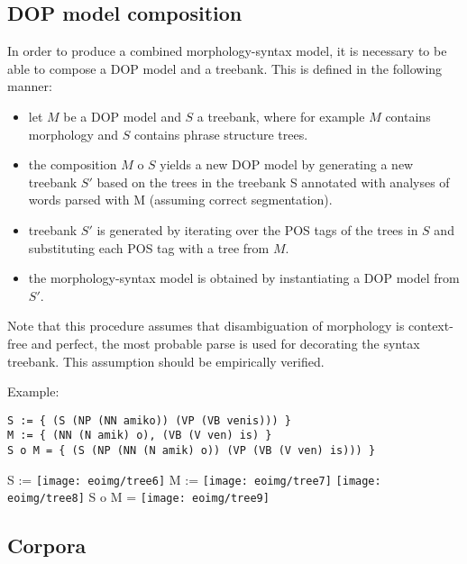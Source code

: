 \documentclass[10pt,a4paper]{article}
\begin{document}
\subsection{DOP model composition}

In order to produce a combined morphology-syntax model, it is necessary to be
able to compose a DOP model and a treebank. This is defined in the following
manner:

\begin{itemize}
\item let $M$ be a DOP model and $S$ a treebank, where for example $M$ contains
      morphology and $S$ contains phrase structure trees.
\item the composition $M$ o $S$ yields a new DOP model by generating a new
      treebank $S'$ based on the trees in the treebank S annotated with
      analyses of words parsed with M (assuming correct segmentation).
\item treebank $S'$ is generated by iterating over the POS tags of the trees in
      $S$ and substituting each POS tag with a tree from $M$.
\item the morphology-syntax model is obtained by instantiating a DOP model from
      $S'$.
\end{itemize}

Note that this procedure assumes that disambiguation of morphology is
context-free and perfect, the most probable parse is used for decorating the
syntax treebank.  This assumption should be empirically verified. 

Example:

\begin{verbatim}
S := { (S (NP (NN amiko)) (VP (VB venis))) } 
M := { (NN (N amik) o), (VB (V ven) is) }
S o M = { (S (NP (NN (N amik) o)) (VP (VB (V ven) is))) }
\end{verbatim}
S := %
\texttt{[image: eoimg/tree6]}
M := %
\texttt{[image: eoimg/tree7]}
\texttt{[image: eoimg/tree8]}
S o M = %
\texttt{[image: eoimg/tree9]}

\subsection{Corpora}
\end{document}
